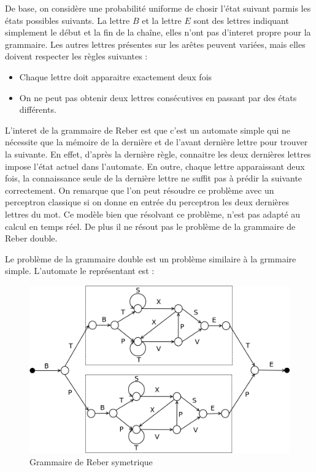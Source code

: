De base, on considère une probabilité uniforme de chosir l'état suivant parmis
les états possibles suivants. La lettre $B$ et la lettre $E$ sont des lettres
indiquant simplement le début et la fin de la chaîne, elles n'ont pas d'interet
propre pour la grammaire. Les autres lettres présentes sur les arêtes peuvent
variées, mais elles doivent respecter les règles suivantes :
\medskip
\begin{itemize}
	\item Chaque lettre doit apparaitre exactement deux fois
	\item On ne peut pas obtenir deux lettres consécutives en passant par des états différents.
\end{itemize}

\vspace{\parskip}
L'interet de la grammaire de Reber est que c'est un automate simple qui ne nécessite que la mémoire de la dernière et de l'avant dernière lettre pour trouver la suivante. En effet, d'après la dernière règle, connaitre les deux dernières lettres impose l'état actuel dans l'automate. En outre, chaque lettre apparaissant deux fois, la connaissance seule de la dernière lettre ne suffit pas à prédir la suivante correctement. On remarque que l'on peut résoudre ce problème avec un perceptron classique si on donne en entrée du perceptron les deux dernières lettres du mot. Ce modèle bien que résolvant ce problème, n'est pas adapté au calcul en temps réel. De plus il ne résout pas le problème de la grammaire de Reber double.

Le problème de la grammaire double est un problème similaire à la grmmaire simple. L'automate le représentant est :

\begin{figure}[!ht]
\begin{center}
\includegraphics[scale=0.4]{images/reberGrammarSymmetric.png}
\end{center}
\caption{Grammaire de Reber symetrique}
\end{figure}


